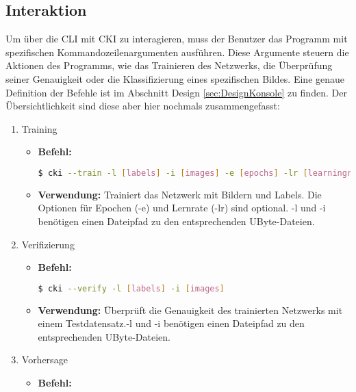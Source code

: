 \subsection{Interaktion}
\label{sec:UsageInteraktion}
Um über die CLI mit CKI zu interagieren, muss der Benutzer das Programm mit spezifischen Kommandozeilenargumenten ausführen. Diese Argumente steuern die Aktionen des Programms, wie das Trainieren des Netzwerks, die Überprüfung seiner Genauigkeit oder die Klassifizierung eines spezifischen Bildes.  Eine genaue Definition der Befehle ist im Abschnitt Design \ref{sec:DesignKonsole} zu finden.
Der Übersichtlichkeit sind diese aber hier nochmals zusammengefasst:
\begin{enumerate}
	\item Training
				\begin{itemize}
					\item \textbf{Befehl:} 
								\begin{lstlisting}[language=bash]
$ cki --train -l [labels] -i [images] -e [epochs] -lr [learningrate]
								\end{lstlisting}
					\item \textbf{Verwendung:} Trainiert das Netzwerk mit Bildern und Labels. Die Optionen für Epochen (-e) und Lernrate (-lr) sind optional. -l und -i benötigen einen Dateipfad zu den entsprechenden UByte-Dateien.
				\end{itemize}
	\item Verifizierung
				\begin{itemize}
					\item \textbf{Befehl:}
								\begin{lstlisting}[language=bash]
$ cki --verify -l [labels] -i [images]
								\end{lstlisting}
					\item \textbf{Verwendung:} Überprüft die Genauigkeit des trainierten Netzwerks mit einem Testdatensatz.-l und -i benötigen einen Dateipfad zu den entsprechenden UByte-Dateien.
				\end{itemize}
	\item Vorhersage
				\begin{itemize}
					\item \textbf{Befehl:}
								\begin{lstlisting}[language=bash]

\end{lstlisting}
\end{itemize}
\end{enumerate}
